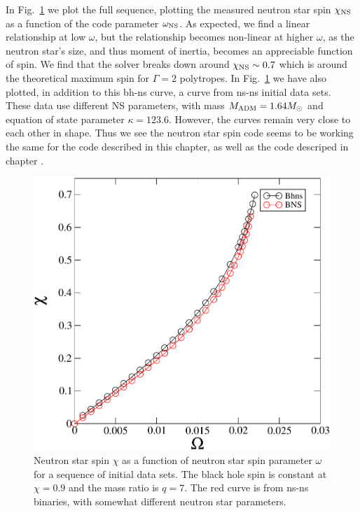 In Fig.~\ref{fig:ChiVOmega} we plot the full sequence, plotting the
measured neutron star spin $\chi_{\rm NS}$ as a function of the code
parameter $\omega_{\rm NS}$. As expected, we find a linear
relationship at low $\omega$, but the relationship becomes non-linear
at higher $\omega$, as the neutron star's size, and thus moment of
inertia, becomes an appreciable function of spin. We find that the
solver breaks down around $\chi_{\rm NS}\sim 0.7$ which is around the
theoretical maximum spin for $\Gamma=2$ polytropes. In
Fig.~\ref{fig:ChiVOmega} we have also plotted, in addition to this
bh-ns curve, a curve from ns-ns initial data sets. These data use
different NS parameters, with mass $M_{\rm ADM}=1.64M_{\odot}$ and
equation of state parameter $\kappa=123.6$. However, the curves remain
very close to each other in shape. Thus we see the neutron star spin
code seems to be working the same for the code described in this
chapter, as well as the code descriped in chapter .

\begin{figure}
\includegraphics[width=0.95\columnwidth]{chap4/chiVOmega}
\caption[$\chi_{\rm NS}$ as a function of $\omega_{\rm NS}$ for bh-ns
binaries]
{\label{fig:ChiVOmega}
Neutron star spin $\chi$ as a function of neutron star spin parameter
$\omega$ for a sequence of initial data sets. The black hole spin is
constant at $\chi=0.9$ and the mass ratio is $q=7$. The red curve is
from ns-ns binaries, with somewhat different neutron star parameters.}
\end{figure}

